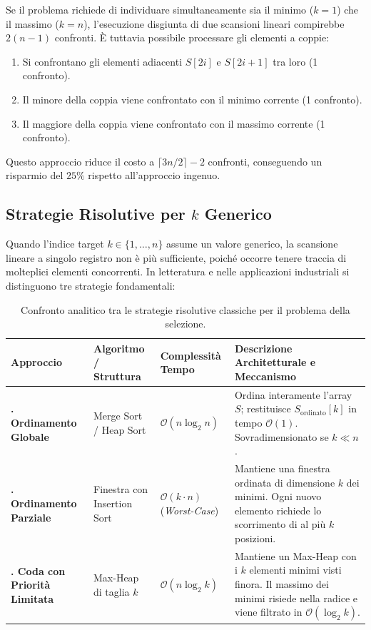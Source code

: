 \begin{property}
Se il problema richiede di individuare simultaneamente sia il minimo ($k=1$) che il massimo ($k=n$), l'esecuzione disgiunta di due scansioni lineari compirebbe $2(n - 1)$ confronti. È tuttavia possibile processare gli elementi a coppie:
\begin{enumerate}
  \item Si confrontano gli elementi adiacenti $S[2i]$ e $S[2i+1]$ tra loro (1 confronto).
  \item Il minore della coppia viene confrontato con il minimo corrente (1 confronto).
  \item Il maggiore della coppia viene confrontato con il massimo corrente (1 confronto).
\end{enumerate}
Questo approccio riduce il costo a $\lceil 3n/2 \rceil - 2$ confronti, conseguendo un risparmio del $25\%$ rispetto all'approccio ingenuo.
\end{property}

\subsection{Strategie Risolutive per $k$ Generico}
\label{subsec:selection-general-strategies}

Quando l'indice target $k \in \{1, \dots, n\}$ assume un valore generico, la scansione lineare a singolo registro non è più sufficiente, poiché occorre tenere traccia di molteplici elementi concorrenti. In letteratura e nelle applicazioni industriali si distinguono tre strategie fondamentali:

\begin{table}[H]
  \centering
  \caption{Confronto analitico tra le strategie risolutive classiche per il problema della selezione.}
  \label{tab:selection-strategies-comparison}
  \begin{tabularx}{\textwidth}{@{}>{\bfseries\arraybackslash}p{}p{}p{}Y@{}}
    \toprule
    Approccio & Algoritmo / Struttura & Complessità Tempo & Descrizione Architetturale e Meccanismo \\
    . Ordinamento Globale & Merge Sort / Heap Sort & $\mathcal{O}(n \log_2 n)$ & Ordina interamente l'array $S$; restituisce $S_{\text{ordinato}}[k]$ in tempo $\mathcal{O}(1)$. Sovradimensionato se $k \ll n$. \\
    . Ordinamento Parziale & Finestra con Insertion Sort & $\mathcal{O}(k \cdot n)$ \newline (\textit{Worst-Case}) & Mantiene una finestra ordinata di dimensione $k$ dei minimi. Ogni nuovo elemento richiede lo scorrimento di al più $k$ posizioni. \\
    . Coda con Priorità Limitata & Max-Heap di taglia $k$ & $\mathcal{O}(n \log_2 k)$ & Mantiene un Max-Heap con i $k$ elementi minimi visti finora. Il massimo dei minimi risiede nella radice e viene filtrato in $\mathcal{O}(\log_2 k)$. \\
    \bottomrule
  \end{tabularx}
\end{table}

